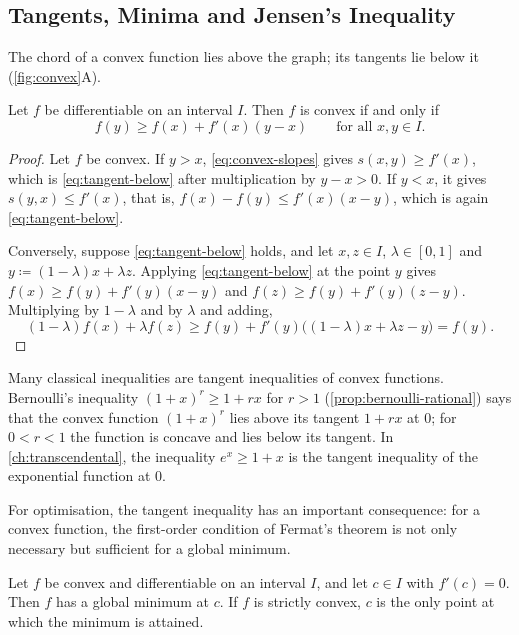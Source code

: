 \subsection{Tangents, Minima and Jensen's Inequality}

The chord of a convex function lies above the graph; its tangents lie below it (\cref{fig:convex}A).

\begin{proposition}
\label{prop:tangent-below}
Let $f$ be differentiable on an interval $I$. Then $f$ is convex if and only if
\begin{equation}
f(y)\ge f(x)+f'(x)(y-x)\qquad\text{for all }x,y\in I .
\label{eq:tangent-below}
\end{equation}
\end{proposition}

\begin{proof}
Let $f$ be convex. If $y>x$, \eqref{eq:convex-slopes} gives $s(x,y)\ge f'(x)$, which is \eqref{eq:tangent-below} after multiplication by $y-x>0$. If $y<x$, it gives $s(y,x)\le f'(x)$, that is, $f(x)-f(y)\le f'(x)(x-y)$, which is again \eqref{eq:tangent-below}.

Conversely, suppose \eqref{eq:tangent-below} holds, and let $x,z\in I$, $\lambda\in[0,1]$ and $y\coloneqq(1-\lambda)x+\lambda z$. Applying \eqref{eq:tangent-below} at the point $y$ gives $f(x)\ge f(y)+f'(y)(x-y)$ and $f(z)\ge f(y)+f'(y)(z-y)$. Multiplying by $1-\lambda$ and by $\lambda$ and adding,
\[
(1-\lambda)f(x)+\lambda f(z)\ge f(y)+f'(y)\bigl((1-\lambda)x+\lambda z-y\bigr)=f(y).
\]
\end{proof}

Many classical inequalities are tangent inequalities of convex functions. Bernoulli's inequality $(1+x)^r\ge1+rx$ for $r>1$ (\cref{prop:bernoulli-rational}) says that the convex function $(1+x)^r$ lies above its tangent $1+rx$ at $0$; for $0<r<1$ the function is concave and lies below its tangent. In \cref{ch:transcendental}, the inequality $e^x\ge1+x$ is the tangent inequality of the exponential function at $0$.

For optimisation, the tangent inequality has an important consequence: for a convex function, the first-order condition of Fermat's theorem is not only necessary but sufficient for a global minimum.

\begin{corollary}
\label{cor:convex-minimum}
Let $f$ be convex and differentiable on an interval $I$, and let $c\in I$ with $f'(c)=0$. Then $f$ has a global minimum at $c$. If $f$ is strictly convex, $c$ is the only point at which the minimum is attained.
\end{corollary}

